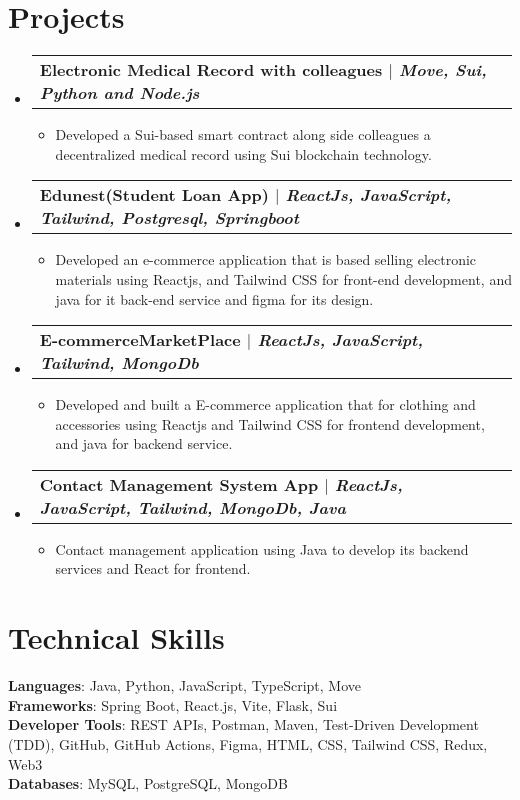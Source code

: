 \documentclass[letterpaper,11pt]{article}
\makeatletter
\newcommand{\resumeItem}[1]{
  \item\small{
    {#1 \vspace{-2pt}}
  }
}
\newcommand{\resumeProjectHeading}[2]{
    \item
    \begin{tabular*}{0.97\textwidth}{l@{\extracolsep{\fill}}r}
      \small#1 & #2 \\
    \end{tabular*}\vspace{-7pt}
}
\newcommand{\resumeSubHeadingListStart}{\begin{itemize}[leftmargin=0.15in, label={}]}
\newcommand{\resumeSubHeadingListEnd}{\end{itemize}}
\newcommand{\resumeItemListStart}{\begin{itemize}}
\newcommand{\resumeItemListEnd}{\end{itemize}\vspace{-5pt}}
\makeatother
\begin{document}
\section{Projects}
    \resumeSubHeadingListStart
      \resumeProjectHeading
          {\textbf{Electronic Medical Record with colleagues $|$ \emph{Move, Sui, Python and Node.js}}}{}
          \resumeItemListStart
            \resumeItem{Developed a Sui-based smart contract along side colleagues a decentralized medical record using Sui blockchain technology.}
          \resumeItemListEnd
      \resumeProjectHeading
          {\textbf{Edunest(Student Loan App) $|$ \emph{ReactJs, JavaScript, Tailwind, Postgresql, Springboot}}}{}
          \resumeItemListStart
            \resumeItem{Developed an e-commerce application that is based selling electronic 
materials using Reactjs, and Tailwind CSS for front-end development, and 
java for it back-end service and figma for its design.}
          \resumeItemListEnd
      \resumeProjectHeading
          {\textbf{E-commerceMarketPlace $|$ \emph{ReactJs, JavaScript, Tailwind, MongoDb}}}{}
          \resumeItemListStart
            \resumeItem{Developed and built a E-commerce application that for clothing and accessories 
using Reactjs and Tailwind CSS for frontend development, and java for backend service.}
          \resumeItemListEnd
      \resumeProjectHeading
          {\textbf{Contact Management System App $|$ \emph{ReactJs, JavaScript, Tailwind, MongoDb, Java}}}{}
          \resumeItemListStart
            \resumeItem{Contact management application using Java to develop its backend services and React for frontend.}
          \resumeItemListEnd
    \resumeSubHeadingListEnd

\section{Technical Skills}
 \begin{itemize}[leftmargin=0.15in, label={}]
    \small{\item{
     \textbf{Languages}: Java, Python, JavaScript, TypeScript, Move \\
     \textbf{Frameworks}: Spring Boot, React.js, Vite, Flask, Sui \\
     \textbf{Developer Tools}: REST APIs, Postman, Maven, Test-Driven Development (TDD), GitHub, GitHub Actions, Figma, HTML, CSS, Tailwind CSS, Redux, Web3 \\
     \textbf{Databases}: MySQL, PostgreSQL, MongoDB
    }}
 \end{itemize}

\end{document}
